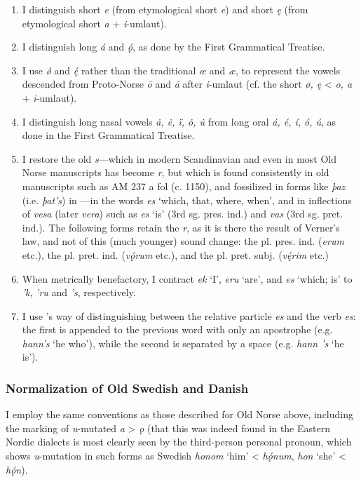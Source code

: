     \begin{enumerate}
    \item I distinguish short \emph{e} (from etymological short \emph{e}) and short \emph{ę} (from etymological short \emph{a} + \emph{i}-umlaut).
    \item I distinguish long \emph{á} and \emph{ǫ́}, as done by the First Grammatical Treatise.
    \item I use \emph{ǿ} and \emph{ę́} rather than the traditional \emph{œ} and \emph{æ}, to represent the vowels descended from Proto-Norse \emph{ō} and \emph{ā} after \emph{i}-umlaut (cf. the short \emph{ø, ę} < \emph{o, a} + \emph{i}-umlaut).
    \item I distinguish long nasal vowels \emph{ȧ, ė, ï, ȯ, u̇} from long oral \emph{á, é, í, ó, ú}, as done in the First Grammatical Treatise.
    \item I restore the old \emph{s}—which in modern Scandinavian and even in most Old Norse manuscripts has become \emph{r}, but which is found consistently in old manuscripts such as AM 237 a fol (c. 1150), and fossilized in forms like \emph{þaz} (i.e. \emph{þat’s}) in \Regius—in the words \emph{es} ‘which, that, where, when’, and in inflections of \emph{vesa} (later \emph{vera}) such as \emph{es} ‘is’ (3rd sg. pres. ind.) and \emph{vas} (3rd sg. pret. ind.). The following forms retain the \emph{r}, as it is there the result of Verner’s law, and not of this (much younger) sound change: the pl. pres. ind. (\emph{erum} etc.), the pl. pret. ind. (\emph{vǫ́rum} etc.), and the pl. pret. subj. (\emph{vę́rim} etc.)
    \item When metrically benefactory, I contract \emph{ek} ‘I’, \emph{eru} ‘are’, and \emph{es} ‘which; is’ to \emph{’k}, \emph{’ru} and \emph{’s}, respectively.
    \item I use \textcite{FinnurEdda}’s way of distinguishing between the relative particle \emph{es} and the verb \emph{es}: the first is appended to the previous word with only an apostrophe (e.g. \emph{hann’s} ‘he who’), while the second is separated by a space (e.g. \emph{hann ’s} ‘he is’).
    \end{enumerate}

    \subsubsection{Normalization of Old Swedish and Danish}
    I employ the same conventions as those described for Old Norse above, including the marking of \emph{u}-mutated \emph{a} > \emph{ǫ} (that this was indeed found in the Eastern Nordic dialects is most clearly seen by the third-person personal pronoun, which shows \emph{u}-mutation in such forms as Swedish \emph{honom} ‘him’ < \emph{hǫ́num}, \emph{hon} ‘she’ < \emph{hǫ́n}).

